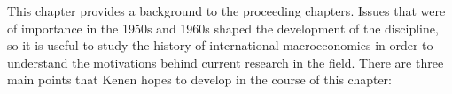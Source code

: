 This chapter provides a background to the proceeding chapters.
Issues that were of importance in the 1950s and 1960s shaped the
development of the discipline, so it is useful to study the history
of international macroeconomics in order to understand the
motivations behind current research in the field. There are three
main points that Kenen hopes to develop in the course of this
chapter: 

